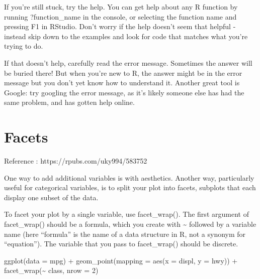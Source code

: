 \documentclass[
  letterpaper,
  DIV=11,
  numbers=noendperiod]{scrreprt}
\newenvironment{Shaded}{\begin{snugshade}}{\end{snugshade}}
\newcommand{\AttributeTok}[1]{\textcolor[rgb]{0.40,0.45,0.13}{#1}}
\newcommand{\DecValTok}[1]{\textcolor[rgb]{0.68,0.00,0.00}{#1}}
\newcommand{\FunctionTok}[1]{\textcolor[rgb]{0.28,0.35,0.67}{#1}}
\newcommand{\NormalTok}[1]{\textcolor[rgb]{0.00,0.23,0.31}{#1}}
\newcommand{\SpecialCharTok}[1]{\textcolor[rgb]{0.37,0.37,0.37}{#1}}
\begin{document}
If you're still stuck, try the help. You can get help about any R
function by running ?function\_name in the console, or selecting the
function name and pressing F1 in RStudio. Don't worry if the help
doesn't seem that helpful - instead skip down to the examples and look
for code that matches what you're trying to do.

If that doesn't help, carefully read the error message. Sometimes the
answer will be buried there! But when you're new to R, the answer might
be in the error message but you don't yet know how to understand it.
Another great tool is Google: try googling the error message, as it's
likely someone else has had the same problem, and has gotten help
online.

\section*{Facets}\label{facets}


Reference : https://rpubs.com/uky994/583752

One way to add additional variables is with aesthetics. Another way,
particularly useful for categorical variables, is to split your plot
into facets, subplots that each display one subset of the data.

To facet your plot by a single variable, use facet\_wrap(). The first
argument of facet\_wrap() should be a formula, which you create with
\textasciitilde{} followed by a variable name (here ``formula'' is the
name of a data structure in R, not a synonym for ``equation''). The
variable that you pass to facet\_wrap() should be discrete.

\begin{Shaded}
\begin{Highlighting}[]
\FunctionTok{ggplot}\NormalTok{(}\AttributeTok{data =}\NormalTok{ mpg) }\SpecialCharTok{+} 
  \FunctionTok{geom\_point}\NormalTok{(}\AttributeTok{mapping =} \FunctionTok{aes}\NormalTok{(}\AttributeTok{x =}\NormalTok{ displ, }\AttributeTok{y =}\NormalTok{ hwy)) }\SpecialCharTok{+} 
  \FunctionTok{facet\_wrap}\NormalTok{(}\SpecialCharTok{\textasciitilde{}}\NormalTok{ class, }\AttributeTok{nrow =} \DecValTok{2}\NormalTok{)}
\end{Highlighting}
\end{Shaded}
\end{document}
